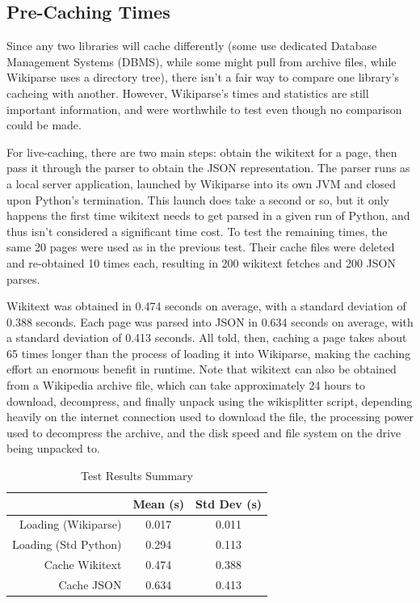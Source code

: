 \subsection{Pre-Caching Times}

Since any two libraries will cache differently (some use dedicated Database Management Systems (DBMS), while some might pull from archive files, while Wikiparse uses a directory tree), there isn't a fair way to compare one library's cacheing with another. However, Wikiparse's times and statistics are still important information, and were worthwhile to test even though no comparison could be made.

For live-caching, there are two main steps: obtain the wikitext for a page, then pass it through the parser to obtain the JSON representation. The parser runs as a local server application, launched by Wikiparse into its own JVM and closed upon Python's termination. This launch does take a second or so, but it only happens the first time wikitext needs to get parsed in a given run of Python, and thus isn't considered a significant time cost. To test the remaining times, the same 20 pages were used as in the previous test. Their cache files were deleted and re-obtained 10 times each, resulting in 200 wikitext fetches and 200 JSON parses.

Wikitext was obtained in 0.474 seconds on average, with a standard deviation of 0.388 seconds. Each page was parsed into JSON in 0.634 seconds on average, with a standard deviation of 0.413 seconds. All told, then, caching a page takes about 65 times longer than the process of loading it into Wikiparse, making the caching effort an enormous benefit in runtime. Note that wikitext can also be obtained from a Wikipedia archive file, which can take approximately 24 hours to download, decompress, and finally unpack using the wikisplitter script, depending heavily on the internet connection used to download the file, the processing power used to decompress the archive, and the disk speed and file system on the drive being unpacked to.

\begin{table}[!t]
\centering
\caption{Test Results Summary}
\label{testresults}
\begin{tabular}{r|cc}
                     & Mean (s) & Std Dev (s) \\ \hline
Loading (Wikiparse)  & 0.017    & 0.011       \\
Loading (Std Python) & 0.294    & 0.113       \\
Cache Wikitext       & 0.474    & 0.388       \\
Cache JSON           & 0.634    & 0.413      
\end{tabular}
\end{table}

